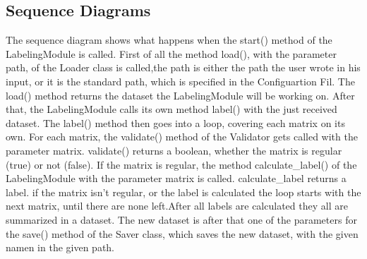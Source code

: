 \documentclass[parskip=full]{scrartcl}
\begin{document}
\subsection{Sequence Diagrams}
The sequence diagram shows what happens when the start() method of the LabelingModule is called. First of all the method load(), with the parameter path, of the Loader class is called,the path is either the path the user wrote in his input, or it is the standard path, which is specified in the Configuartion Fil. The load() method returns the dataset the LabelingModule will be working on. After that, the LabelingModule calls its own method label() with the just received dataset. The label() method then goes into a loop, covering each matrix on its own.
For each matrix, the validate() method of the Validator gets called with the parameter matrix. validate() returns a boolean, whether the matrix is regular (true) or not (false).
If the matrix is regular, the method calculate\_label() of the LabelingModule with the parameter matrix is called. calculate\_label returns a \gls{label}. if the matrix isn't regular, or the \gls{label} is calculated the loop starts with the next matrix, until there are none left.After all \glspl{label} are calculated they all are summarized in a dataset.
The new dataset is after that one of the parameters for the save() method of the Saver class, which saves the new dataset, with the given namen in the given path.

\end{document}
